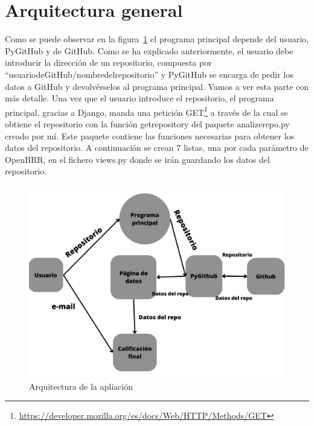 \documentclass[a4paper, 12pt]{book}
\begin{document}
\section{Arquitectura general} 
\label{sec:arquitectura}
Como se puede observar en la figura~\ref{fig:arquitectura principal} el programa principal depende del usuario, PyGitHub y de GitHub. Como se ha explicado anteriormente, el usuario debe introducir la dirección de un repositorio, compuesta por ``usuario\textunderscore de\textunderscore GitHub/nombre\textunderscore del\textunderscore repositorio'' y PyGitHub se encarga de pedir los datos a GitHub y devolvérselos al programa principal. Vamos a ver esta parte con más detalle.
Una vez que el usuario introduce el repositorio, el programa principal, gracias a Django, manda una petición GET\footnote{\url{https://developer.mozilla.org/es/docs/Web/HTTP/Methods/GET}}  a través de la cual se obtiene el repositorio con la función get\textunderscore repository del paquete analize\textunderscore repo.py creado por mí. Este paquete contiene las funciones necesarias para obtener los datos del repositorio. A continuación se crean 7 listas, una por cada parámetro de OpenBRR, en el fichero views.py donde se irán guardando los datos del repositorio.
\begin{figure}
    \centering
    \includegraphics[bb=0 0 800 600, width=12cm, keepaspectratio]{img/programaprincipal.jpg}
    \caption{Arquitectura de la apliación}\label{fig:arquitectura principal}
\end{figure}
\end{document}
